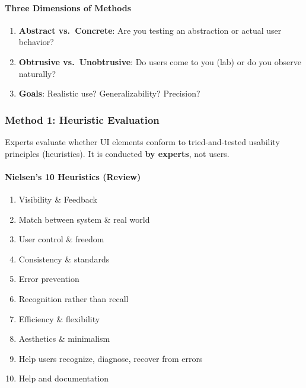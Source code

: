 \paragraph*{Three Dimensions of Methods}
\begin{enumerate}
  \item \textbf{Abstract vs.\ Concrete}: Are you testing an abstraction or actual user behavior?
  \item \textbf{Obtrusive vs.\ Unobtrusive}: Do users come to you (lab) or do you observe naturally?
  \item \textbf{Goals}: Realistic use? Generalizability? Precision?
\end{enumerate}

\subsubsection*{Method 1: Heuristic Evaluation}

\begin{defbox}
Experts evaluate whether UI elements conform to tried-and-tested usability principles (heuristics). It is conducted \textbf{by experts}, not users.
\end{defbox}

\paragraph*{Nielsen's 10 Heuristics (Review)}
\begin{enumerate}
  \item Visibility \& Feedback
  \item Match between system \& real world
  \item User control \& freedom
  \item Consistency \& standards
  \item Error prevention
  \item Recognition rather than recall
  \item Efficiency \& flexibility
  \item Aesthetics \& minimalism
  \item Help users recognize, diagnose, recover from errors
  \item Help and documentation
\end{enumerate}

